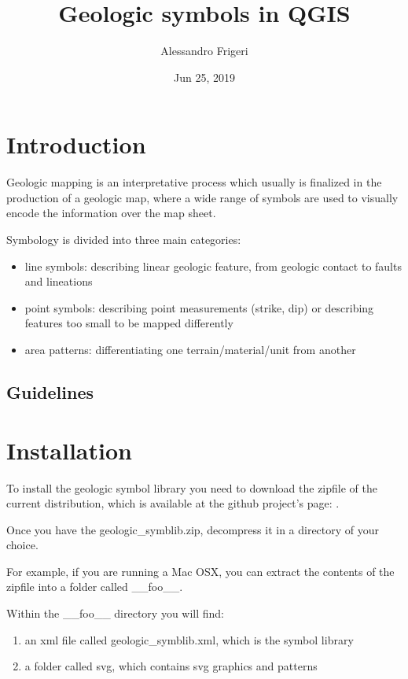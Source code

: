 \documentclass[letterpaper,10pt,english]{sphinxmanual}
\title{Geologic symbols in QGIS}
\date{Jun 25, 2019}
\author{Alessandro Frigeri}
\begin{document}
\pagestyle{empty}
\sphinxmaketitle
\pagestyle{plain}
\sphinxtableofcontents
\pagestyle{normal}
\label{\detokenize{index::doc}}



\chapter{Introduction}
\label{\detokenize{intro:introduction}}\label{\detokenize{intro::doc}}
Geologic mapping is an interpretative process which usually is finalized in the production of a geologic map, where a wide range of symbols are used to visually encode the information over the map sheet.

Symbology is divided into three main categories:
\begin{itemize}
\item {} 
line symbols: describing linear geologic feature, from geologic contact to faults and lineations

\item {} 
point symbols: describing point measurements (strike, dip) or describing features too small to be mapped differently

\item {} 
area patterns: differentiating one terrain/material/unit from another

\end{itemize}


\section{Guidelines}
\label{\detokenize{intro:guidelines}}

\chapter{Installation}
\label{\detokenize{installation:installation}}\label{\detokenize{installation::doc}}
To install the geologic symbol library you need to download the zipfile of the current distribution, which is available at the github project’s page: .

Once you have the geologic\_symblib.zip, decompress it in a directory of your choice.

For example, if you are running a Mac OSX, you can extract the contents of the zipfile into a folder called \_\_foo\_\_.

Within the \_\_foo\_\_ directory you will find:
\begin{enumerate}
\def\theenumi{\arabic{enumi}}
\def\labelenumi{\theenumi .}
\makeatletter\def\p@enumii{\p@enumi \theenumi .}\makeatother
\item {} 
an xml file called geologic\_symblib.xml, which is the symbol library

\item {} 
a folder called svg, which contains svg graphics and patterns

\end{enumerate}
\end{document}
